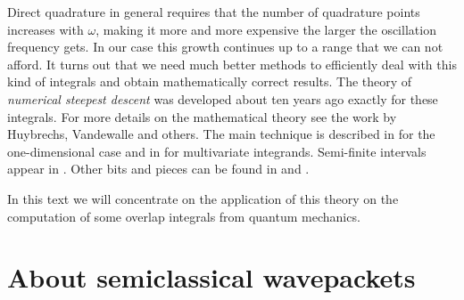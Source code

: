 \documentclass[a4paper,10pt]{article}
\begin{document}
Direct quadrature in general requires that the number of quadrature points
increases with $\omega$, making it more and more expensive the larger the
oscillation frequency gets. In our case this growth continues up to a range
that we can not afford.
It turns out that we need much better methods to efficiently deal with this
kind of integrals and obtain mathematically correct results.
The theory of \emph{numerical steepest descent} was developed about ten
years ago exactly for these integrals. For more details on the mathematical theory
see the work by Huybrechs, Vandewalle and others. The main technique
is described in \cite{HV_hoq} for the one-dimensional case and in \cite{HV_cub}
for multivariate integrands. Semi-finite intervals appear in \cite{H_nsd_sii}.
Other bits and pieces can be found in \cite{AH_cgq} and \cite{AH_cgq_it}.

In this text we will concentrate on the application of this theory on
the computation of some overlap integrals from quantum mechanics.


\section{About semiclassical wavepackets}
\end{document}

